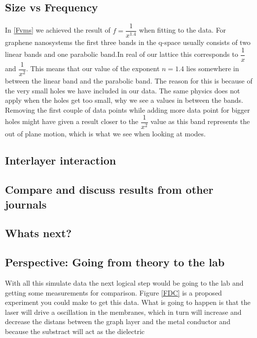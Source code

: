 \subsection{Size vs Frequency}
In \cref{Fvms} we achieved the result of $f=\dfrac{1}{x^{1.4}}$ when fitting to the data. For graphene nanosystems the first three bands in the q-space usually consists of two linear bands and one parabolic band.In real of our lattice this corresponds to $\dfrac{1}{x}$ and $\dfrac{1}{x^{2}}$. This means that our value of the exponent $n=1.4$ lies somewhere in between the linear band and the parabolic band. The reason for this is because of the very small holes we have included in our data. The same physics does not apply when the holes get too small, why we see a values in between the bands. Removing the first couple of data points while adding more data point for bigger holes might have given a result closer to the $\dfrac{1}{x^{2}}$ value as this band represents the out of plane motion, which is what we see when looking at modes. 
\subsection{Interlayer interaction}

\subsection{Compare and discuss results from other journals}

\subsection{Whats next?}

\subsection{Perspective: Going from theory to the lab}
With all this simulate data the next logical step would be going to the lab and getting some measurements for comparison. Figure \ref{FDC} is a proposed experiment you could make to get this data. What is going to happen is that the laser will drive a oscillation in the membranes, which in turn will increase and decrease the distans between the graph layer and the metal conductor and because the substract will act as the dielectric 

